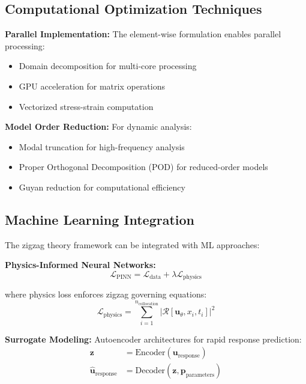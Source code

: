 \documentclass[12pt,a4paper]{article}
\begin{document}
\subsection{Computational Optimization Techniques}

\textbf{Parallel Implementation:} The element-wise formulation enables parallel processing:

\begin{itemize}
\item Domain decomposition for multi-core processing
\item GPU acceleration for matrix operations
\item Vectorized stress-strain computation
\end{itemize}

\textbf{Model Order Reduction:} For dynamic analysis:
\begin{itemize}
\item Modal truncation for high-frequency analysis
\item Proper Orthogonal Decomposition (POD) for reduced-order models
\item Guyan reduction for computational efficiency
\end{itemize}

\subsection{Machine Learning Integration}

The zigzag theory framework can be integrated with ML approaches:

\textbf{Physics-Informed Neural Networks:}
\begin{equation}
\mathcal{L}_{\text{PINN}} = \mathcal{L}_{\text{data}} + \lambda \mathcal{L}_{\text{physics}}
\end{equation}

where physics loss enforces zigzag governing equations:
\begin{equation}
\mathcal{L}_{\text{physics}} = \sum_{i=1}^{n_{\text{collocation}}} \left|\mathcal{R}[\mathbf{u}_\theta, x_i, t_i]\right|^2
\end{equation}

\textbf{Surrogate Modeling:} Autoencoder architectures for rapid response prediction:
\begin{align}
\mathbf{z} &= \text{Encoder}(\mathbf{u}_{\text{response}}) \\
\hat{\mathbf{u}}_{\text{response}} &= \text{Decoder}(\mathbf{z}, \mathbf{p}_{\text{parameters}})
\end{align}
\end{document}
